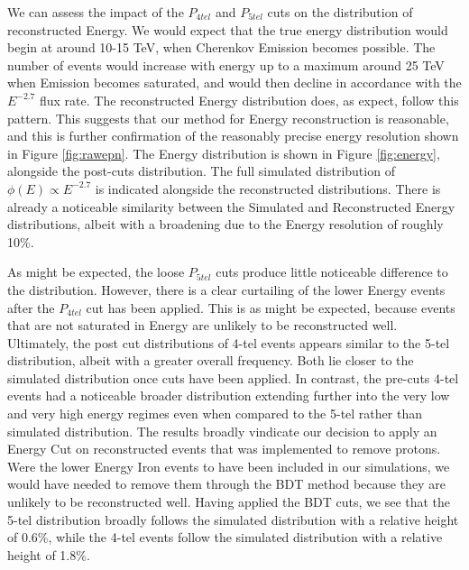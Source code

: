 \documentclass[11pt]{article}
\begin{document}
We can assess the impact of the $P_{4tel}$ and $P_{5tel}$ cuts on the distribution of reconstructed Energy. We would expect that the true energy distribution would begin at around 10-15 TeV, when Cherenkov Emission becomes possible. The number of events would increase with energy up to a maximum around 25 TeV when Emission becomes saturated, and would then decline in accordance with the $E^{-2.7}$ flux rate. The reconstructed Energy distribution does, as expect, follow this pattern. This suggests that our method for Energy reconstruction is reasonable, and this is further confirmation of the reasonably precise energy resolution shown in Figure \ref{fig:rawepn}. The Energy distribution is shown in Figure \ref{fig:energy}, alongside the post-cuts distribution. The full simulated distribution of $\phi(E) \propto E^{-2.7}$ is indicated alongside the reconstructed distributions. There is already a noticeable similarity between the Simulated and Reconstructed Energy distributions, albeit with a broadening due to the Energy resolution of roughly 10\%. 

As might be expected, the loose $P_{5tel}$ cuts produce little noticeable difference to the distribution. However, there is a clear curtailing of the lower Energy events after the $P_{4tel}$ cut has been applied. This is as might be expected, because events that are not saturated in Energy are unlikely to be reconstructed well. Ultimately, the post cut distributions of 4-tel events appears similar to the 5-tel distribution, albeit with a greater overall frequency. Both lie closer to the simulated distribution once cuts have been applied. In contrast, the pre-cuts 4-tel events had a noticeable broader distribution extending further into the very low and very high energy regimes even when compared to the 5-tel rather than simulated distribution. The results broadly vindicate our decision to apply an Energy Cut on reconstructed events that was implemented to remove protons. Were the lower Energy Iron events to have been included in our simulations, we would have needed to remove them through the BDT method because they are unlikely to be reconstructed well. Having applied the BDT cuts, we see that the 5-tel distribution broadly follows the simulated distribution with a relative height of 0.6\%, while the 4-tel events follow the simulated distribution with a relative height of 1.8\%. 
\end{document}
